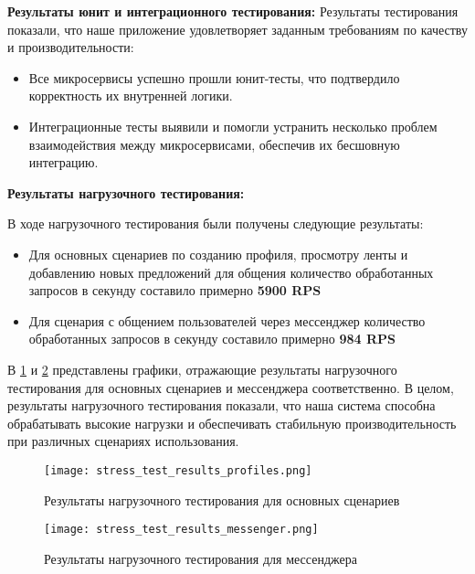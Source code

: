 \textbf{Результаты юнит и интеграционного тестирования:}
Результаты тестирования показали, что наше приложение удовлетворяет заданным требованиям по качеству и производительности:
\begin{itemize}
    \item Все микросервисы успешно прошли юнит-тесты, что подтвердило корректность их внутренней логики.
    \item Интеграционные тесты выявили и помогли устранить несколько проблем взаимодействия между микросервисами, обеспечив их бесшовную интеграцию.
\end{itemize}

\textbf{Результаты нагрузочного тестирования:}

В ходе нагрузочного тестирования были получены следующие результаты:

\begin{itemize}
    \item Для основных сценариев по созданию профиля, просмотру ленты и добавлению новых предложений для общения количество обработанных запросов в секунду составило примерно \textbf{5900 RPS}
    \item Для сценария с общением пользователей через мессенджер количество обработанных запросов в секунду составило примерно \textbf{984 RPS}
\end{itemize}

В \ref{stress_test_profiles} и \ref{stress_test_messenger} представлены графики, отражающие результаты нагрузочного тестирования для основных сценариев и мессенджера соответственно.
В целом, результаты нагрузочного тестирования показали, что наша система способна обрабатывать высокие нагрузки и обеспечивать стабильную производительность при различных сценариях использования.

\begin{landscape}
    \begin{figure}[!h]
        \centering
        \texttt{[image: stress\_test\_results\_profiles.png]}
        \caption{Результаты нагрузочного тестирования для основных сценариев}
        \label{stress_test_profiles}
    \end{figure}
\end{landscape}

\begin{landscape}
    \begin{figure}[!h]
        \centering
        \texttt{[image: stress\_test\_results\_messenger.png]}
        \caption{Результаты нагрузочного тестирования для мессенджера}
        \label{stress_test_messenger}
    \end{figure}
\end{landscape}


